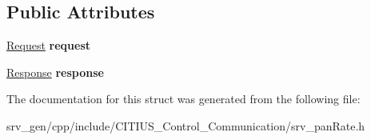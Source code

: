 \subsection*{\-Public \-Attributes}
\begin{DoxyCompactItemize}
\item 
\hypertarget{struct_c_i_t_i_u_s___control___communication_1_1srv__pan_rate_ab0b70f1b8d4169a66d0d831fa6294dfc}{\hyperlink{struct_c_i_t_i_u_s___control___communication_1_1srv__pan_rate_request__}{\-Request} {\bfseries request}}\label{struct_c_i_t_i_u_s___control___communication_1_1srv__pan_rate_ab0b70f1b8d4169a66d0d831fa6294dfc}

\item 
\hypertarget{struct_c_i_t_i_u_s___control___communication_1_1srv__pan_rate_a181a6938bf829de137d07676cf33ae30}{\hyperlink{struct_c_i_t_i_u_s___control___communication_1_1srv__pan_rate_response__}{\-Response} {\bfseries response}}\label{struct_c_i_t_i_u_s___control___communication_1_1srv__pan_rate_a181a6938bf829de137d07676cf33ae30}

\end{DoxyCompactItemize}


\-The documentation for this struct was generated from the following file\-:\begin{DoxyCompactItemize}
\item 
srv\-\_\-gen/cpp/include/\-C\-I\-T\-I\-U\-S\-\_\-\-Control\-\_\-\-Communication/srv\-\_\-pan\-Rate.\-h\end{DoxyCompactItemize}
